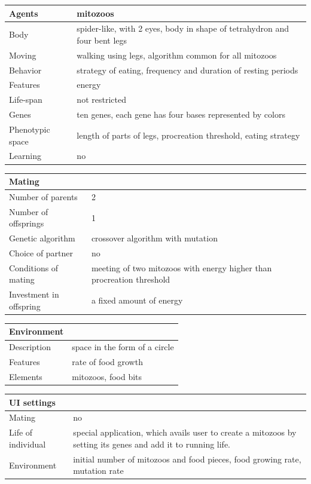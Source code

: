 \documentclass[a4paper,12pt]{report}
\begin{document}
\vspace{20pt}
\begin{tabular}{|p{150pt}|p{220pt}|}
\hline
\textbf{Agents}&mitozoos \\ \hline
Body&spider-like, with 2 eyes, body in shape of tetrahydron and four bent legs \\ \hline
Moving&walking using legs, algorithm common for all mitozoos \\ \hline
Behavior&strategy of eating, frequency and duration of resting periods \\ \hline
Features&energy \\ \hline
Life-span&not restricted \\ \hline
Genes&ten genes, each gene has four bases represented by colors \\ \hline
Phenotypic space&length of parts of legs, procreation threshold, eating strategy \\ \hline
Learning&no \\ \hline
\end{tabular} 

\vspace{10pt}
 \begin{tabular}{|p{150pt}|p{220pt}|} \hline \textbf{Mating}& \\ \hline
Number of parents&2 \\ \hline
Number of offsprings&1 \\ \hline
Genetic algorithm&crossover algorithm with mutation \\ \hline
Choice of partner&no \\ \hline
Conditions of mating&meeting of two mitozoos with energy higher than procreation threshold \\ \hline
Investment in offspring&a fixed amount of energy \\ \hline
\end{tabular} 

 \vspace{10pt} \begin{tabular}{|p{150pt}|p{220pt}|} \hline \textbf{Environment}& \\ \hline
Description&space in the form of a circle \\ \hline
Features&rate of food growth \\ \hline
Elements&mitozoos, food bits \\ \hline
\end{tabular} 

 \vspace{10pt}
 \begin{tabular}{|p{150pt}|p{220pt}|} \hline \textbf{UI settings}& \\ \hline
Mating&no \\ \hline
Life of individual&special application, which avails user to create a mitozoos by setting its genes and add it to running life. \\ \hline
Environment&initial number of mitozoos and food pieces, food growing rate, mutation rate \\ \hline
\end{tabular} 
\end{document}
